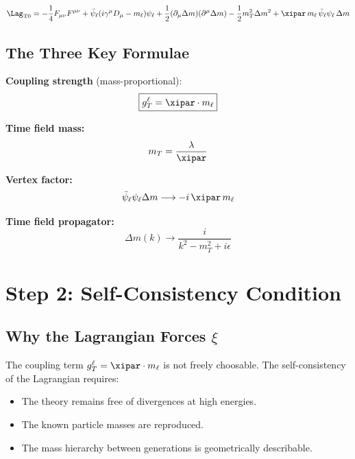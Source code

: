 \begin{keyresult}
\begin{equation}
	\Lag_{\text{T0}} = -\frac{1}{4} F_{\mu\nu}F^{\mu\nu}
	+ \bar{\psi}_\ell(i\gamma^\mu D_\mu - m_\ell)\psi_\ell
	+ \frac{1}{2}(\partial_\mu \Delta m)(\partial^\mu \Delta m)
	- \frac{1}{2} m_T^2 \Delta m^2
	+ \xipar \, m_\ell \,\bar{\psi}_\ell \psi_\ell \, \Delta m
\end{equation}
\end{keyresult}

\subsection{The Three Key Formulae}

\textbf{Coupling strength} (mass-proportional):
\begin{equation}
	\boxed{g_T^\ell = \xipar \cdot m_\ell}
\end{equation}

\textbf{Time field mass:}
\begin{equation}
	m_T = \frac{\lambda}{\xipar}
\end{equation}

\textbf{Vertex factor:}
\begin{equation}
	\bar{\psi}_\ell \psi_\ell \Delta m \longrightarrow -i\,\xipar\, m_\ell
\end{equation}

\textbf{Time field propagator:}
\begin{equation}
	\Delta m(k) \longrightarrow \frac{i}{k^2 - m_T^2 + i\epsilon}
\end{equation}

\section{Step 2: Self-Consistency Condition}

\subsection{Why the Lagrangian Forces \texorpdfstring{$\xi$}{xi}}

The coupling term $g_T^\ell = \xipar \cdot m_\ell$ is not freely choosable. The self-consistency of the Lagrangian requires:
\begin{itemize}
	\item The theory remains free of divergences at high energies.
	\item The known particle masses are reproduced.
	\item The mass hierarchy between generations is geometrically describable.
\end{itemize}

